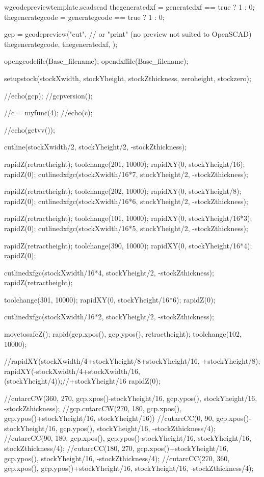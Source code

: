 \documentclass{ltxdoc}
\begin{document}
\begin{writecode}{w}{gcodepreviewtemplate.scad}{scad}
thegeneratedxf = generatedxf == true ? 1 : 0;
thegenerategcode = generategcode == true ? 1 : 0;

gcp = gcodepreview("cut", // or "print" (no preview not suited to OpenSCAD)
                   thegenerategcode,
                   thegeneratedxf,
                   );

opengcodefile(Base_filename);
opendxffile(Base_filename);

setupstock(stockXwidth, stockYheight, stockZthickness, zeroheight, stockzero);

//echo(gcp);
//gcpversion();

//c = myfunc(4);
//echo(c);

//echo(getvv());

cutline(stockXwidth/2, stockYheight/2, -stockZthickness);

rapidZ(retractheight);
toolchange(201, 10000);
rapidXY(0, stockYheight/16);
rapidZ(0);
cutlinedxfgc(stockXwidth/16*7, stockYheight/2, -stockZthickness);


rapidZ(retractheight);
toolchange(202, 10000);
rapidXY(0, stockYheight/8);
rapidZ(0);
cutlinedxfgc(stockXwidth/16*6, stockYheight/2, -stockZthickness);

rapidZ(retractheight);
toolchange(101, 10000);
rapidXY(0, stockYheight/16*3);
rapidZ(0);
cutlinedxfgc(stockXwidth/16*5, stockYheight/2, -stockZthickness);

rapidZ(retractheight);
toolchange(390, 10000);
rapidXY(0, stockYheight/16*4);
rapidZ(0);

cutlinedxfgc(stockXwidth/16*4, stockYheight/2, -stockZthickness);
rapidZ(retractheight);

toolchange(301, 10000);
rapidXY(0, stockYheight/16*6);
rapidZ(0);

cutlinedxfgc(stockXwidth/16*2, stockYheight/2, -stockZthickness);


movetosafeZ();
rapid(gcp.xpos(), gcp.ypos(), retractheight);
toolchange(102, 10000);

//rapidXY(stockXwidth/4+stockYheight/8+stockYheight/16, +stockYheight/8);
rapidXY(-stockXwidth/4+stockXwidth/16, (stockYheight/4));//+stockYheight/16
rapidZ(0);

//cutarcCW(360, 270, gcp.xpos()-stockYheight/16, gcp.ypos(), stockYheight/16, -stockZthickness);
//gcp.cutarcCW(270, 180, gcp.xpos(), gcp.ypos()+stockYheight/16, stockYheight/16))
//cutarcCC(0, 90, gcp.xpos()-stockYheight/16, gcp.ypos(), stockYheight/16, -stockZthickness/4);
//cutarcCC(90, 180, gcp.xpos(), gcp.ypos()-stockYheight/16, stockYheight/16, -stockZthickness/4);
//cutarcCC(180, 270, gcp.xpos()+stockYheight/16, gcp.ypos(), stockYheight/16, -stockZthickness/4);
//cutarcCC(270, 360, gcp.xpos(), gcp.ypos()+stockYheight/16, stockYheight/16, -stockZthickness/4);


\end{writecode}
\end{document}
